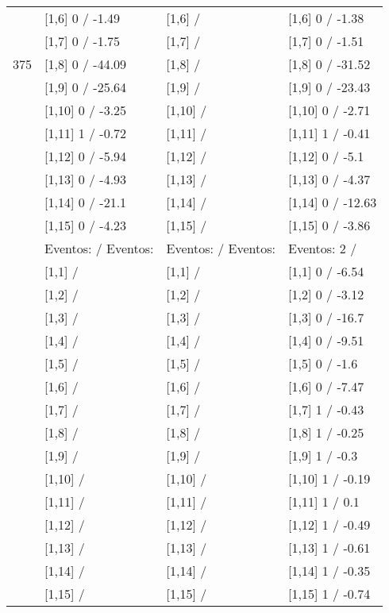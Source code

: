 \begin{table}
\begin{tabular}[t]{llll}
 & {}[1,6] 0  / -1.49 & {}[1,6]  / & {}[1,6] 0  / -1.38\\
 & {}[1,7] 0  / -1.75 & {}[1,7]  / & {}[1,7] 0  / -1.51\\
375 & {}[1,8] 0  / -44.09 & {}[1,8]  / & {}[1,8] 0  / -31.52\\
\addlinespace
 & {}[1,9] 0  / -25.64 & {}[1,9]  / & {}[1,9] 0  / -23.43\\
 & {}[1,10] 0  / -3.25 & {}[1,10]  / & {}[1,10] 0  / -2.71\\
 & {}[1,11] 1  / -0.72 & {}[1,11]  / & {}[1,11] 1  / -0.41\\
 & {}[1,12] 0  / -5.94 & {}[1,12]  / & {}[1,12] 0  / -5.1\\
 & {}[1,13] 0  / -4.93 & {}[1,13]  / & {}[1,13] 0  / -4.37\\
\addlinespace
 & {}[1,14] 0  / -21.1 & {}[1,14]  / & {}[1,14] 0  / -12.63\\
 & {}[1,15] 0  / -4.23 & {}[1,15]  / & {}[1,15] 0  / -3.86\\
 & Eventos:   / Eventos: & Eventos:   / Eventos: & Eventos:  2 /\\
 & {}[1,1]  / & {}[1,1]  / & {}[1,1] 0  / -6.54\\
 & {}[1,2]  / & {}[1,2]  / & {}[1,2] 0  / -3.12\\
\addlinespace
 & {}[1,3]  / & {}[1,3]  / & {}[1,3] 0  / -16.7\\
 & {}[1,4]  / & {}[1,4]  / & {}[1,4] 0  / -9.51\\
 & {}[1,5]  / & {}[1,5]  / & {}[1,5] 0  / -1.6\\
 & {}[1,6]  / & {}[1,6]  / & {}[1,6] 0  / -7.47\\
 & {}[1,7]  / & {}[1,7]  / & {}[1,7] 1  / -0.43\\
\addlinespace
500 & {}[1,8]  / & {}[1,8]  / & {}[1,8] 1  / -0.25\\
 & {}[1,9]  / & {}[1,9]  / & {}[1,9] 1  / -0.3\\
 & {}[1,10]  / & {}[1,10]  / & {}[1,10] 1  / -0.19\\
 & {}[1,11]  / & {}[1,11]  / & {}[1,11] 1  / 0.1\\
 & {}[1,12]  / & {}[1,12]  / & {}[1,12] 1  / -0.49\\
\addlinespace
 & {}[1,13]  / & {}[1,13]  / & {}[1,13] 1  / -0.61\\
 & {}[1,14]  / & {}[1,14]  / & {}[1,14] 1  / -0.35\\
 & {}[1,15]  / & {}[1,15]  / & {}[1,15] 1  / -0.74\\
\bottomrule
\end{tabular}
\end{table}
